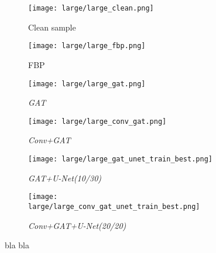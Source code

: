\begin{figure}[H]
  \captionsetup[subfigure]{justification=centering}
  \centering
  \begin{subfigure}[t]{0.16\textwidth}
    \texttt{[image: large/large\_clean.png]}
    \caption{Clean sample}
  \end{subfigure}
  \begin{subfigure}[t]{0.16\textwidth}
    \texttt{[image: large/large\_fbp.png]}
    \caption{FBP}
  \end{subfigure}
  \begin{subfigure}[t]{0.16\textwidth}
    \texttt{[image: large/large\_gat.png]}
    \caption{\textit{GAT}}
  \end{subfigure}
  \begin{subfigure}[t]{0.16\textwidth}
    \texttt{[image: large/large\_conv\_gat.png]}
    \caption{\textit{Conv+GAT}}
  \end{subfigure}
  \begin{subfigure}[t]{0.16\textwidth}
    \texttt{[image: large/large\_gat\_unet\_train\_best.png]}
    \caption{\textit{GAT+U-Net(10/30)}}
  \end{subfigure}
  \begin{subfigure}[t]{0.16\textwidth}
    \texttt{[image: large/large\_conv\_gat\_unet\_train\_best.png]}
    \caption{\textit{Conv+GAT+U-Net(20/20)}}
  \end{subfigure}


  \caption[Fig title]{bla bla}
\end{figure}

